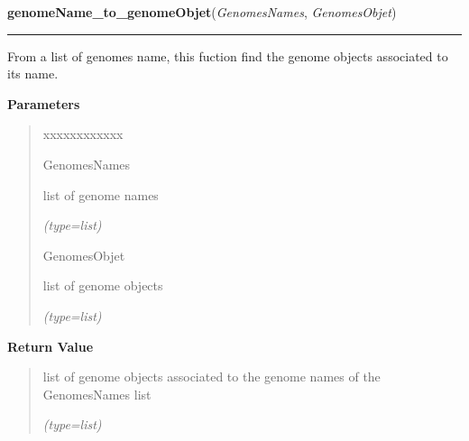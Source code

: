\hspace{.8\funcindent}\begin{boxedminipage}{\funcwidth}

    \raggedright \textbf{genomeName\_to\_genomeObjet}(\textit{GenomesNames}, \textit{GenomesObjet})

    \vspace{-1.5ex}

    \rule{\textwidth}{0.5\fboxrule}
\setlength{\parskip}{2ex}
    From a list of genomes name, this fuction find the genome objects 
    associated to its name.

\setlength{\parskip}{1ex}
      \textbf{Parameters}
      \vspace{-1ex}

      \begin{quote}
        \begin{Ventry}{xxxxxxxxxxxx}

          \item[GenomesNames]

          list of genome names

            {\it (type=list)}

          \item[GenomesObjet]

          list of genome objects

            {\it (type=list)}

        \end{Ventry}

      \end{quote}

      \textbf{Return Value}
    \vspace{-1ex}

      \begin{quote}
      list of genome objects associated to the genome names of the 
      GenomesNames list

      {\it (type=list)}

      \end{quote}

    \end{boxedminipage}

    \label{script-FixedVar:createDicoPos}

    \vspace{0.5ex}

